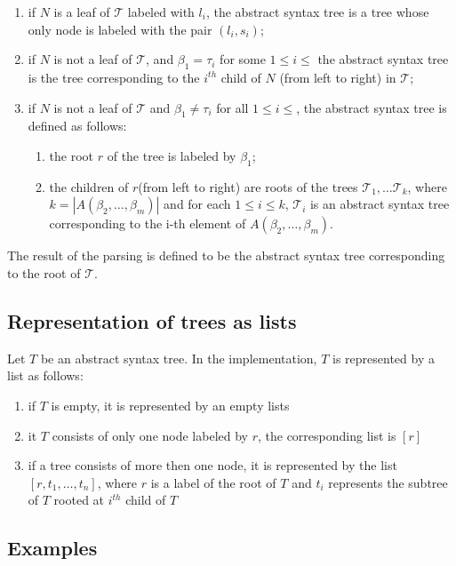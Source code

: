 \documentclass[a4paper,10pt]{article}
\begin{document}
\begin{enumerate}
\item if $N$ is a leaf of $\mathcal{T}$ labeled with $l_i$, the abstract syntax tree is a tree whose only node is labeled with the pair $(l_i,s_i)$;

\item if $N$ is not a leaf of $\mathcal{T}$, and $\beta_1=\tau_i$ for some $1\le i\le$ the abstract syntax tree is the tree corresponding to the $i^{th}$ child of $N$ (from left to right) in $\mathcal{T}$;

\item if $N$ is not a leaf of $\mathcal{T}$  and $\beta_1\not=\tau_i$ for all $1\le i\le$, the abstract syntax tree is defined as follows:
\begin{enumerate}
\item the root $r$ of the tree is labeled by $\beta_1$;
\item the children of $r$(from left to right) are roots of the trees $\mathcal{T}_1, \ldots \mathcal{T}_k$, where $k = |A(\beta_2,\ldots,\beta_m)|$ and for each $1 \le i\le k$,  $\mathcal{T}_i$ is an abstract syntax tree corresponding to the i-th element of $A(\beta_2,\ldots,\beta_m)$.
\end{enumerate}
 
\end{enumerate}

The result of the parsing is defined to be the abstract syntax tree corresponding to the root of $\mathcal{T}$.  


\subsection{Representation of trees as lists}
Let $T$ be an abstract syntax tree.
In the implementation, $T$ is  represented by a list as follows:
\begin{enumerate}
\item if $T$ is empty, it is represented by an empty lists
\item it $T$ consists of only one node labeled by $r$, the corresponding list is $[r]$
\item if a tree consists of more then one node, it is represented by the list $[r,t_1,\ldots,t_n]$, where $r$ is a label of the root of $T$ and  $t_i$ represents the subtree of $T$ rooted at $i^{th}$ child of $T$ 
\end{enumerate}

\subsection{Examples}
\end{document}
